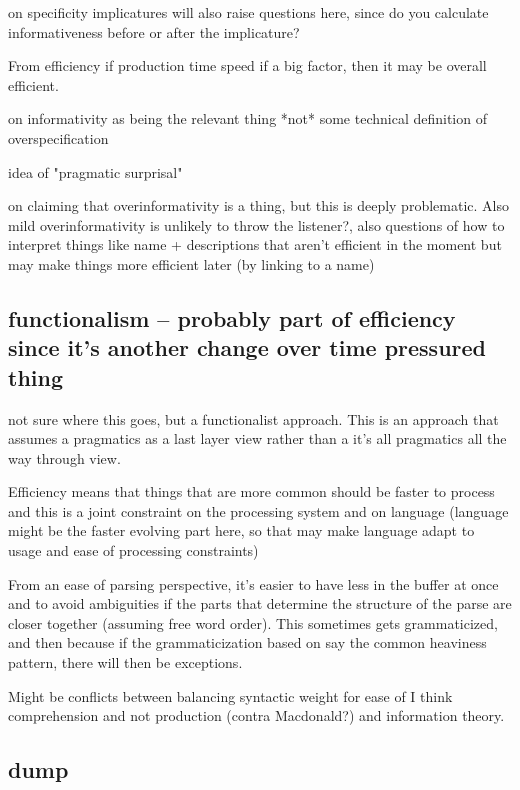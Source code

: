 \documentclass[]{article}
\begin{document}
\cite{bergen} on specificity implicatures will also raise questions here, since do you calculate informativeness before or after the implicature? 

From efficiency if production time speed if a big factor, then it may be overall efficient. 

\cite{degen20200406} on informativity as being the relevant thing *not* some technical definition of overspecification 

idea of "pragmatic surprisal" 

\cite{heller2012} on claiming that overinformativity is a thing, but this is deeply problematic. Also mild overinformativity is unlikely to throw the listener?, also questions of how to interpret things like name + descriptions that aren't efficient in the moment but may make things more efficient later (by linking to a name) 

\subsection{functionalism -- probably part of efficiency since it's another change over time pressured thing }

\cite{hawkins1995} not sure where this goes, but a functionalist approach. This is an approach that assumes a pragmatics as a last layer view rather than a it's all pragmatics all the way through view. 

Efficiency means that things that are more common should be faster to process and this is a joint constraint on the processing system and on language (language might be the faster evolving part here, so that may make language adapt to usage and ease of processing constraints)

From an ease of parsing perspective, it's easier to have less in the buffer at once and to avoid ambiguities if the parts that determine the structure of the parse are closer together (assuming free word order). This sometimes gets grammaticized, and then because if the grammaticization based on say the common heaviness pattern, there will then be exceptions. 

Might be conflicts between balancing syntactic weight for ease of I think comprehension and not production (contra Macdonald?) and information theory. 

\subsection{dump}
\end{document}
